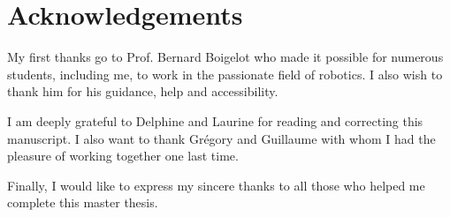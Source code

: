 \clearpage
{}
\setcounter{page}{1}
\chapter*{Acknowledgements}
My first thanks go to Prof. Bernard Boigelot who made it possible for numerous students, including me, to work in the passionate field of robotics. I also wish to thank him for his guidance, help and accessibility.

I am deeply grateful to Delphine and Laurine for reading and correcting this manuscript. I also want to thank Grégory and Guillaume with whom I had the pleasure of working together one last time.

Finally, I would like to express my sincere thanks to all those who helped me complete this master thesis.